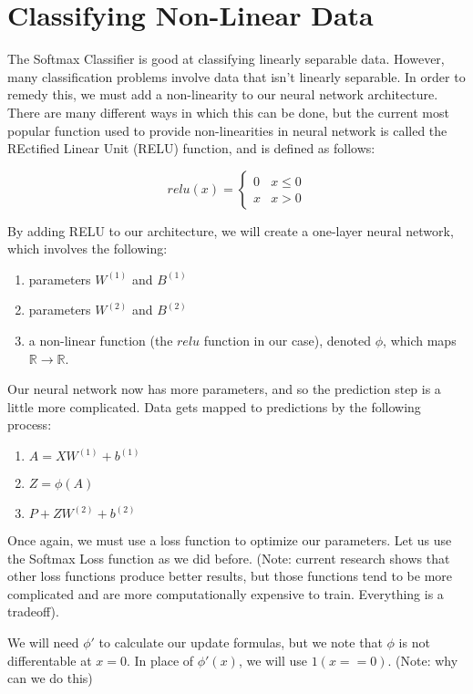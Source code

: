 \newpage
\section{Classifying Non-Linear Data}
The Softmax Classifier is good at classifying linearly separable data. However,
many classification problems involve data that isn't linearly separable. In
order to remedy this, we must add a non-linearity to our neural network
architecture. There are many different ways in which this can be done, but the
current most popular function used to provide non-linearities in neural network
is called the REctified Linear Unit (RELU) function, and is defined as follows:

\[ relu(x) = \begin{cases} 
      0 & x\leq 0 \\
      x & x > 0 
   \end{cases}
\]

By adding RELU to our architecture, we will create a one-layer neural network,
which involves the following:
\begin{enumerate}
\item parameters $W^{(1)}$ and $B^{(1)}$
\item parameters $W^{(2)}$ and $B^{(2)}$ \item a non-linear function (the
$relu$ function in our case), denoted $\phi$, which maps $\mathbb{R}
\longrightarrow \mathbb{R}$.
\end{enumerate}

Our neural network now has more parameters, and so the prediction step is a
little more complicated. Data gets mapped to predictions by the following
process:
\begin{enumerate}
\item $A = XW^{(1)} + b^{(1)}$
\item $Z = \phi(A)$
\item $P + ZW^{(2)} + b^{(2)}$
\end{enumerate}

Once again, we must use a loss function to optimize our parameters. Let us use
the Softmax Loss function as we did before. (Note: current research shows that
other loss functions produce better results, but those functions tend to be
more complicated and are more computationally expensive to train. Everything is
a tradeoff).

We will need $\phi\prime$ to calculate our update formulas, but we note that
$\phi$ is not differentable at $x=0$. In place of $\phi\prime(x)$, we will use
$1(x == 0)$. (Note: why can we do this)

